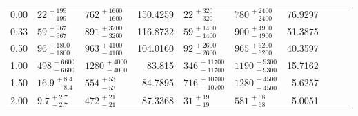 \begin{tabular}{@{}rllr llr llr@{}}
\cmidrule(lr){1-7}
0.00 & $22^{\,+199}_{\,-199}$ & $762^{\,+1600}_{\,-1600}$ & 150.4259
     & $22^{\,+320}_{\,-320}$ & $780^{\,+2400}_{\,-2400}$ & 76.9297\\[1.5pt]
0.33 & $59^{\,+967}_{\,-967}$ & $891^{\,+3200}_{\,-3200}$ & 116.8732
     & $59^{\,+1400}_{\,-1400}$ & $900^{\,+4900}_{\,-4900}$ & 51.3875\\[1.5pt]
0.50 & $96^{\,+1800}_{\,-1800}$ & $963^{\,+4100}_{\,-4100}$ & 104.0160
     & $92^{\,+2600}_{\,-2600}$ & $965^{\,+6200}_{\,-6200}$ & 40.3597\\[1.5pt]
1.00 & $498^{\,+6600}_{\,-6600}$ & $1280^{\,+4000}_{\,-4000}$ & 83.815
     & $346^{\,+11700}_{\,-11700}$ & $1190^{\,+9300}_{\,-9300}$ & 15.7162\\[1.5pt]
1.50 & $16.9^{\,+8.4}_{\,-8.4}$ & $554^{\,+53}_{\,-53}$ & 84.7895
     & $716^{\,+10700}_{\,-10700}$ & $1280^{\,+4500}_{\,-4500}$ & 5.6257\\[1.5pt]
2.00 & $9.7^{\,+2.7}_{\,-2.7}$ & $472^{\,+21}_{\,-21}$ & 87.3368
     & $31^{\,+19}_{\,-19}$ & $581^{\,+68}_{\,-68}$ & 5.0051\\

\bottomrule
\end{tabular} 
